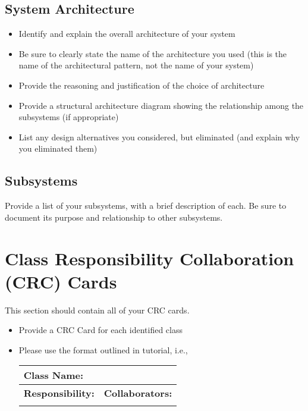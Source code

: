 \documentclass[]{article}
\begin{document}
\subsection{System Architecture}
\label{sub:system_architecture}
\begin{itemize}
	\item Identify and explain the overall architecture of your system
	\item Be sure to clearly state the name of the architecture you used (this is the name of the architectural pattern, not the name of your system)
	\item Provide the reasoning and justification of the choice of architecture
	\item Provide a structural architecture diagram showing the relationship among the subsystems (if appropriate)
	\item List any design alternatives you considered, but eliminated (and explain why you eliminated them)
\end{itemize}

\subsection{Subsystems}
\label{sub:subsystems}
 Provide a list of your subsystems, with a brief description of each. Be sure to document its purpose and relationship to other subsystems.


	
\section{Class Responsibility Collaboration (CRC) Cards}
\label{sec:class_responsibility_collaboration_crc_cards}
This section should contain all of your CRC cards.

\begin{itemize}
	\item Provide a CRC Card for each identified class
	\item Please use the format outlined in tutorial, i.e., 
	\begin{table}[ht]
		\centering
		\begin{tabular}{|p{5cm}|p{5cm}|}
		\hline 
		 \multicolumn{2}{|l|}{\textbf{Class Name:}} \\
		\hline
		\textbf{Responsibility:} & \textbf{Collaborators:} \\
		\hline
		\vspace{1in} & \\
		\hline
		\end{tabular}
	\end{table}
	
\end{itemize}
\end{document}
